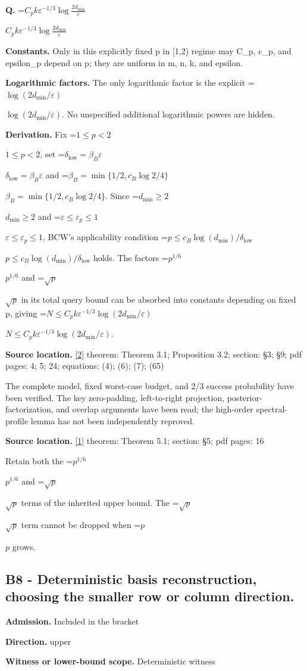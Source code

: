 \documentclass[10pt,a4paper]{article}
\newcommand{\AtlasMath}[1]{\par\begingroup\centering\setbox0=\hbox{$\displaystyle #1$}\ifdim\wd0>1.4\linewidth\typeout{ATLAS WIDE FORMULA: \the\wd0}\fi\ifdim\wd0>\linewidth\resizebox{\linewidth}{!}{\box0}\else\box0\fi\par\endgroup}
\newcommand{\AtlasInlineMath}[1]{\begingroup\setbox0=\hbox{$#1$}\ifdim\wd0>.4\linewidth\endgroup\AtlasMath{#1}\else\endgroup$#1$\fi}
\begin{document}
\textbf{Q.} \AtlasInlineMath{C_p k\varepsilon^{-1/3}\log\!\frac{2d_{\mathrm{min}}}{\varepsilon}}

\textbf{Constants.} Only in this explicitly fixed p in [1,2) regime may C\_p, c\_p, and epsilon\_p depend on p; they are uniform in m, n, k, and epsilon.

\textbf{Logarithmic factors.} The only logarithmic factor is the explicit \AtlasInlineMath{\log(2d_{\mathrm{min}}/\varepsilon)}. No unspecified additional logarithmic powers are hidden.

\textbf{Derivation.} Fix \AtlasInlineMath{1\le p<2}, set \AtlasInlineMath{\delta_{\mathrm{low}}=\beta_B\varepsilon} and \AtlasInlineMath{\beta_B=\min\{1/2,c_B\log2/4\}}. Since \AtlasInlineMath{d_{\mathrm{min}}\ge2} and \AtlasInlineMath{\varepsilon\le\varepsilon_p\le1}, BCW's applicability condition \AtlasInlineMath{p\le c_B\log(d_{\mathrm{min}})/\delta_{\mathrm{low}}} holds. The factors \AtlasInlineMath{p^{1/6}} and \AtlasInlineMath{\sqrt p} in its total query bound can be absorbed into constants depending on fixed p, giving \AtlasInlineMath{N\le C_p k\varepsilon^{-1/3}\log(2d_{\mathrm{min}}/\varepsilon)}.

\textbf{Source location.} \href{https://arxiv.org/pdf/2609.35840v2}{[2]} theorem: Theorem 3.1; Proposition 3.2; section: §3; §9; pdf pages: 4; 5; 24; equations: (4); (6); (7); (65)

The complete model, fixed worst-case budget, and 2/3 success probability have been verified. The key zero-padding, left-to-right projection, posterior-factorization, and overlap arguments have been read; the high-order spectral-profile lemma has not been independently reproved.

\textbf{Source location.} \href{https://arxiv.org/pdf/2202.05120v4}{[1]} theorem: Theorem 5.1; section: §5; pdf pages: 16

Retain both the \AtlasInlineMath{p^{1/6}} and \AtlasInlineMath{\sqrt p} terms of the inherited upper bound. The \AtlasInlineMath{\sqrt p} term cannot be dropped when \AtlasInlineMath{p} grows.

\subsection{B8 - Deterministic basis reconstruction, choosing the smaller row or column direction.}
\textbf{Admission.} Included in the bracket

\textbf{Direction.} upper

\textbf{Witness or lower-bound scope.} Deterministic witness
\end{document}
